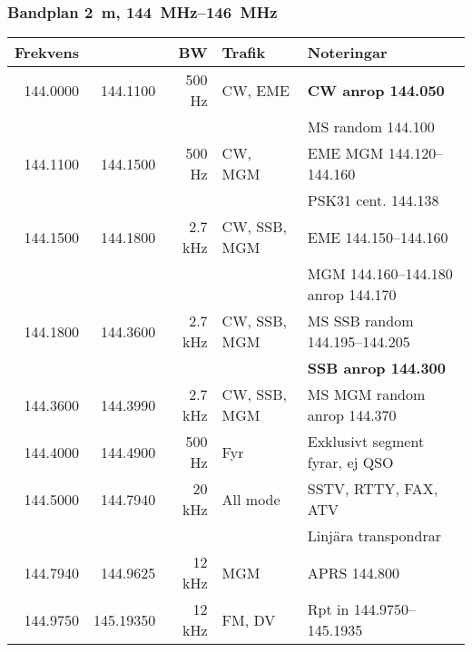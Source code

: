 \subsubsection{Bandplan \SI{2}{\metre}, \SIrange{144}{146}{\mega\hertz}}
\begin{tabular}{rrrll}
\textbf{Frekvens} &           & \textbf{BW} & \textbf{Trafik}
& \textbf{Noteringar}                                             \\ \hline

144.0000 & 144.1100  & 500 Hz  & CW, EME      & \textbf{CW anrop \num{144,050}}                                 \\
         &           &         &              & MS random \num{144,100}                                         \\ \hline
144.1100 & 144.1500  & 500 Hz  & CW, MGM      & EME MGM \numrange{144,120}{144,160}                             \\
         &           &         &              & PSK31 cent. \num{144,138}                                       \\ \hline
144.1500 & 144.1800  & 2.7 kHz & CW, SSB, MGM & EME \numrange{144,150}{144,160}                                 \\
         &           &         &              & MGM \numrange{144,160}{144,180} anrop \num{144,170}             \\ \hline
144.1800 & 144.3600  & 2.7 kHz & CW, SSB, MGM & MS SSB random \numrange{144,195}{144,205}                       \\
         &           &         &              & \textbf{SSB anrop \num{144,300}}                                \\ \hline
144.3600 & 144.3990  & 2.7 kHz & CW, SSB, MGM & MS MGM random anrop \num{144,370}                               \\ \hline
144.4000 & 144.4900  & 500 Hz  & Fyr          & Exklusivt segment fyrar, ej QSO                                 \\ \hline
144.5000 & 144.7940  & 20 kHz  & All mode     & SSTV, RTTY, FAX, ATV                                            \\
         &           &         &              & Linjära transpondrar                                            \\ \hline
144.7940 & 144.9625  & 12 kHz  & MGM          & APRS \num{144,800}                                              \\ \hline
144.9750 & 145.19350 & 12 kHz  & FM, DV       & Rpt in \numrange{144,9750}{145,1935}                            \\

\end{tabular}
